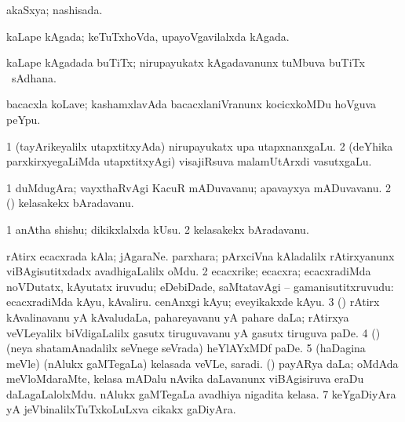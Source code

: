 \bentry
{} 
\gl{\gu}
\expl{}
\bmng
akaSxya; nashisada. 
\emng
\eentry

\bentry
{} 
\gl{\nA}
\expl{}
\bmng
kaLape kAgada; keTuTxhoVda, upayoVgavilalxda kAgada. 
\emng
\eentry

\bentry
{} 
\gl{\nA}
\expl{}
\bmng
kaLape kAgadada buTiTx; nirupayukatx kAgadavanunx tuMbuva buTiTx \mo\ sAdhana. 
\emng
\eentry

\bentry
{} 
\gl{\nA}
\expl{}
\bmng
bacacxla koLave; kashamxlavAda bacacxlaniVranunx kocicxkoMDu hoVguva peYpu. 
\emng
\eentry

\bentry
{} 
\gl{\nA}
\expl{}
\bmng
\bnum
\num{1} (tayArikeyalilx utapxtitxyAda) nirupayukatx upa utapxnanxgaLu. 
\num{2} (deYhika parxkirxyegaLiMda utapxtitxyAgi) visajiRsuva malamUtArxdi vasutxgaLu. 
\enum
\emng
\eentry

\bentry
{} 
\gl{\nA}
\expl{}
\bmng
\bnum
\num{1} duMdugAra; vayxthaRvAgi KacuR mADuvavanu; apavayxya mADuvavanu. 
\num{2} (\AmA) kelasakekx bAradavanu. 
\enum
\emng
\eentry

\bentry
{} 
\gl{\nA}
\expl{}
\bmng
\bnum
\num{1} anAtha shishu; dikikxlalxda kUsu. 
\num{2} kelasakekx bAradavanu. 
\enum
\emng
\eentry

\bentry
{} 
\gl{\nA}
\expl{}
\bmng
\bnum
{} 
\banum
{} rAtirx ecacxrada kAla; jAgaraNe. 
 parxhara; pArxciVna kAladalilx rAtirxyanunx viBAgisutitxdadx avadhigaLalilx oMdu. 
\eanum
\numie
\num{2} ecacxrike; ecacxra; ecacxradiMda noVDutatx, kAyutatx iruvudu; eDebiDade, saMtatavAgi -- gamanisutitxruvudu:  ecacxradiMda kAyu, kAvaliru.  cenAnxgi kAyu; eveyikakxde kAyu. 
\num{3} (\ca) rAtirx kAvalinavanu yA kAvaludaLa, pahareyavanu yA pahare daLa; rAtirxya veVLeyalilx biVdigaLalilx gasutx tiruguvavanu yA gasutx tiruguva paDe. 
\num{4} (\ca) (neya shatamAnadalilx seVnege seVrada) heYlAYxMDf paDe. 
\num{5} (haDagina meVle) (nAlukx gaMTegaLa) kelasada veVLe, saradi. 
 (\nw) 
\banum
{} payARya daLa; oMdAda meVloMdaraMte, kelasa mADalu nAvika daLavanunx viBAgisiruva eraDu daLagaLalolxMdu. 
 nAlukx gaMTegaLa avadhiya nigadita kelasa. 
\eanum
\numie
\num{7} keYgaDiyAra yA jeVbinalilxTuTxkoLuLxva cikakx gaDiyAra. 
\enum
\emng

